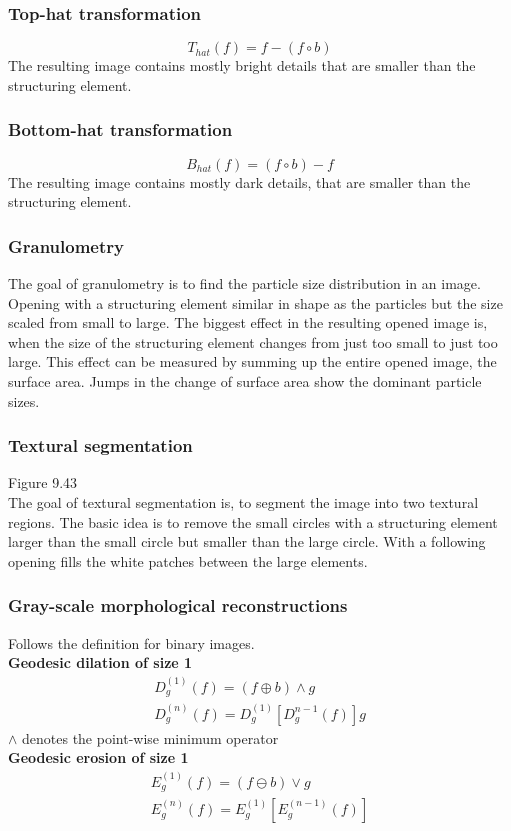 \subsubsection{Top-hat transformation}
\[
	T_{hat}(f) = f -(f \circ b)
\]
The resulting image contains mostly bright details that are smaller than the structuring element.
\subsubsection{Bottom-hat transformation}
\[
	B_{hat}(f) = (f \circ b)-f
\]
The resulting image contains mostly dark details, that are smaller than the structuring element.
\subsubsection{Granulometry}
The goal of granulometry is to find the particle size distribution in an image. Opening with a structuring element similar in shape as the particles but the size scaled from small to large. The biggest effect in the resulting opened image is, when the size of the structuring element changes from just too small to just too large. This effect can be measured by summing up the entire opened image, the surface area. Jumps in the change of surface area show the dominant particle sizes.
\subsubsection{Textural segmentation}
Figure 9.43\\
The goal of textural segmentation is, to segment the image into two textural regions. The basic idea is to remove the small circles with a structuring element larger than the small circle but smaller than the large circle. With a following opening fills the white patches between the large elements.
\subsubsection{Gray-scale morphological reconstructions}
Follows the definition for binary images.\\
\textbf{Geodesic dilation of size 1}
\begin{align*}
	D_g^{(1)}(f) = (f\oplus b)\wedge g\\
	D_g^{(n)}(f) = D_g^{(1)}[D_g^{n-1}(f)] g
\end{align*}
$\wedge$ denotes the point-wise minimum operator\\
\textbf{Geodesic erosion of size 1}
\begin{align*}
	E_g^{(1)}(f) = (f\ominus b)\vee g\\
	E_g^{(n)}(f) = E_g^{(1)}[E_g^{(n-1)}(f)]
\end{align*}

